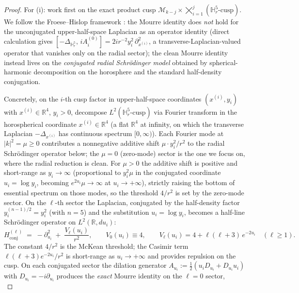 \documentclass[11pt,letterpaper]{article}
\theoremstyle{definition}
\newcommand{\bbR}{\mathbb{R}}
\newcommand{\bbH}{\mathbb{H}}
\newcommand{\cM}{\mathcal{M}}
\newcommand{\Lap}{\Delta}
\begin{document}
\begin{proof}
For (i): work first on the exact product cusp $\cM_{k-j}\times \bigtimes_{i=1}^j (\bbH^5_r\text{-cusp})$. We follow the Froese--Hislop framework \cite{FroeseHislop1989}: the Mourre identity does \emph{not} hold for the unconjugated upper-half-space Laplacian as an operator identity (direct calculation gives $[-\Lap_{\bbH^5_r},\,iA_i^{(0)}] = 2i r^{-2} y_i^2\,\partial_{x^{(i)}}^2$, a transverse-Laplacian-valued operator that vanishes only on the radial sector); the clean Mourre identity instead lives on the \emph{conjugated radial Schr\"odinger model} obtained by spherical-harmonic decomposition on the horosphere and the standard half-density conjugation.

Concretely, on the $i$-th cusp factor in upper-half-space coordinates $(x^{(i)},y_i)$ with $x^{(i)}\in\bbR^4$, $y_i>0$, decompose $L^2(\bbH^5_r\text{-cusp})$ via Fourier transform in the horospherical coordinate $x^{(i)}\in\bbR^4$ (a flat $\bbR^4$ at infinity, on which the transverse Laplacian $-\Lap_{x^{(i)}}$ has continuous spectrum $[0,\infty)$). Each Fourier mode at $|k|^2 = \mu \ge 0$ contributes a nonnegative additive shift $\mu\cdot y_i^2/r^2$ to the radial Schr\"odinger operator below; the $\mu = 0$ (zero-mode) sector is the one we focus on, where the radial reduction is clean. For $\mu > 0$ the additive shift is positive and short-range as $y_i \to \infty$ (proportional to $y_i^2 \mu$ in the conjugated coordinate $u_i = \log y_i$, becoming $e^{2u_i}\mu \to \infty$ at $u_i \to +\infty$), strictly raising the bottom of essential spectrum on those modes, so the threshold $4/r^2$ is set by the zero-mode sector. On the $\ell$-th sector the Laplacian, conjugated by the half-density factor $y_i^{(n-1)/2} = y_i^{2}$ (with $n = 5$) and the substitution $u_i = \log y_i$, becomes a half-line Schr\"odinger operator on $L^2(\bbR, du_i)$:
\begin{equation}\label{eq:Hconj-ell}
H_{\mathrm{conj}}^{(\ell)} \;=\; -\partial_{u_i}^2 \;+\; \frac{V_\ell(u_i)}{r^2}, \qquad V_0(u_i) \equiv 4, \qquad V_\ell(u_i) = 4 + \ell(\ell+3)\,e^{-2u_i} \quad (\ell\ge 1).
\end{equation}
The constant $4/r^2$ is the McKean threshold; the Casimir term $\ell(\ell+3)e^{-2u_i}/r^2$ is short-range as $u_i\to+\infty$ and provides repulsion on the cusp. On each conjugated sector the dilation generator $A_{u_i} := \tfrac12(u_i D_{u_i} + D_{u_i} u_i)$ with $D_{u_i} = -i\partial_{u_i}$ produces the \emph{exact} Mourre identity on the $\ell=0$ sector,
\begin{equation}\label{eq:Hconj-mourre}

\end{equation}
\end{proof}
\end{document}
